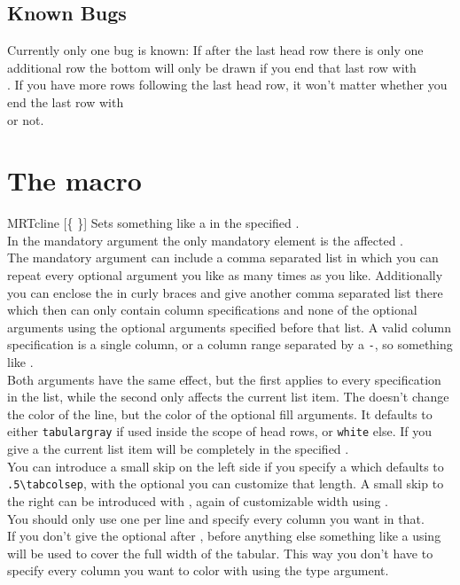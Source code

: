 \subsection{Known Bugs}
Currently only one bug is known: If after the last head row there is only one
additional row the bottom  will only be drawn if you end that last row
with \texttt{\string\\}. If you have more rows following the last head row,
it won't matter whether you end the last row with \texttt{\string\\} or not.

\section{The  macro}\label{sec:tab:cline}%
\begin{describemacro}{MRTcline}%
  [\meta{!}\{\meta{*}%
  \}]
  Sets something like a  in the specified .
  \\[\parskip]
  In the mandatory argument the only mandatory element is the affected
  .
  \\[\parskip]
  The mandatory argument can include a comma separated list in which you can
  repeat every optional argument you like as many times as you like.
  Additionally you can enclose the  in curly braces and give another
  comma separated list there which then can only contain column specifications
  and none of the optional arguments using the optional arguments specified
  before that list. A valid column specification is a single column, or a column
  range separated by a \texttt{-}, so something like .
  \\[\parskip]
  Both  arguments have the same effect, but the first applies to
  every specification in the list, while the second only affects the current
  list item. The  doesn't change the color of the line, but the
  color of the optional fill arguments. It defaults to either
  \texttt{tabulargray} if used inside the scope of head rows, or \texttt{white}
  else. If you give a \meta{*} the current list item will be completely in the
  specified .
  \\[\parskip]
  You can introduce a small skip on the left side if you specify a \meta{<}
  which defaults to \verb|.5\tabcolsep|, with the optional  you
  can customize that length. A small skip to the right can be introduced with
  \meta{>}, again of customizable width using .
  \\[\parskip]
  You should only use one  per line and specify every column you
  want in that.
  \\[\parskip]
  If you don't give the optional \meta{!} after , before anything
  else something like a  using  will be used to cover the
  full width of the tabular. This way you don't have to specify every column you
  want to color with  using the \meta{*} type argument.
\end{describemacro}%

